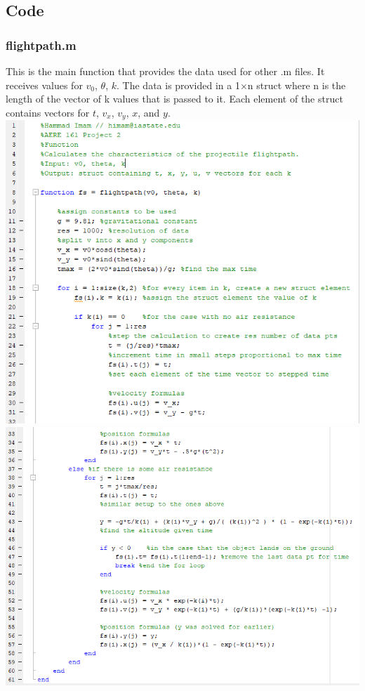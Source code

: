 \documentclass[oneside]{article}
\begin{document}
\subsection{Code}
\subsubsection{flightpath.m}
This is the main function that provides the data used for other .m files. It receives values for $v_0$, $\theta$, $k$. The data is provided in a 1$\times$n struct where n is the length of the vector of k values that is passed to it. Each element of the struct contains vectors for $t$, $v_x$, $v_y$, $x$, and $y$.\\ 
\includegraphics [width=\linewidth*4/5]{code_flightpath1.png}\\
\includegraphics [width=\linewidth*4/5]{code_flightpath2.png}
\newpage
\end{document}
